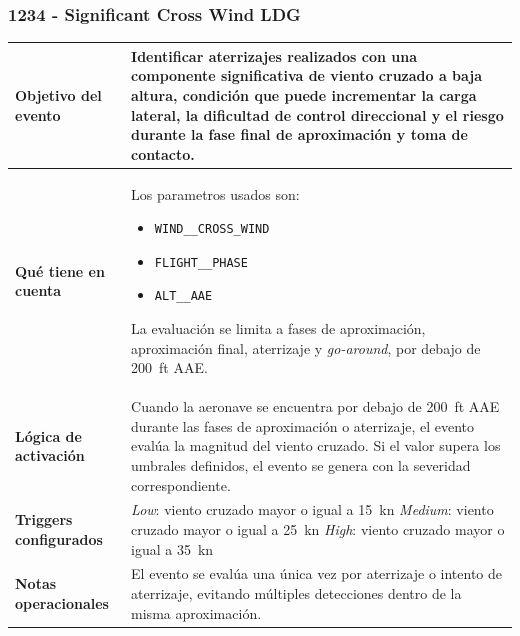 \documentclass[11pt,a4paper]{article}
\begin{document}
	\subsubsection{1234 - Significant Cross Wind LDG}
	\begin{table}[H]
		\centering
		\renewcommand{\arraystretch}{1.3}
		\begin{tabular}{p{5cm} p{9.5cm}}
			\hline
			\textbf{Objetivo del evento} &
			Identificar aterrizajes realizados con una componente significativa de viento cruzado a baja altura, condición que puede incrementar la carga lateral, la dificultad de control direccional y el riesgo durante la fase final de aproximación y toma de contacto. \\
			\hline
			\textbf{Qué tiene en cuenta} & Los parametros usados son:
			\begin{itemize}
				\item \texttt{WIND\_\_CROSS\_WIND}
				\item \texttt{FLIGHT\_\_PHASE}
				\item \texttt{ALT\_\_AAE}
			\end{itemize}
			La evaluación se limita a fases de aproximación, aproximación final, aterrizaje y \textit{go-around}, por debajo de \SI{200}{ft} AAE. \\
			\hline
			\textbf{Lógica de activación} &
			Cuando la aeronave se encuentra por debajo de \SI{200}{ft} AAE durante las fases de aproximación o aterrizaje, el evento evalúa la magnitud del viento cruzado. Si el valor supera los umbrales definidos, el evento se genera con la severidad correspondiente. \\
			\hline
			\textbf{Triggers configurados} &
			\textit{Low}: viento cruzado mayor o igual a \SI{15}{\knot} \newline
			\textit{Medium}: viento cruzado mayor o igual a \SI{25}{\knot} \newline
			\textit{High}: viento cruzado mayor o igual a \SI{35}{\knot} \\
			\hline
			\textbf{Notas operacionales} &
			El evento se evalúa una única vez por aterrizaje o intento de aterrizaje, evitando múltiples detecciones dentro de la misma aproximación. \\
			\hline
		\end{tabular}
	\end{table}
\end{document}
